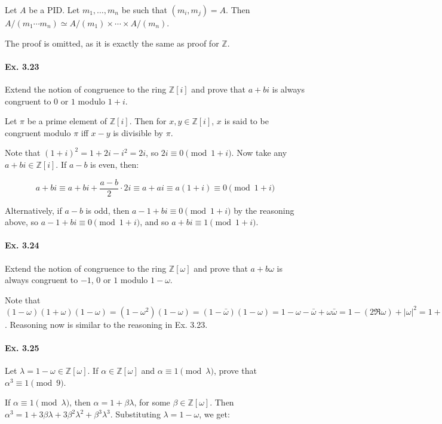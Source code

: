 \documentclass[notitlepage]{article}
\theoremstyle{definition}
\newcommand\Z{\mathbb{Z}}
\begin{document}
Let $A$ be a PID. Let $m_1, \ldots, m_n$ be such that $(m_i, m_j) =
A$. Then $A/(m_1 \cdots m_n) \simeq A/(m_1) \times \cdots \times
A/(m_n)$.

The proof is omitted, as it is exactly the same as proof for $\Z$.

\paragraph{Ex. 3.23}
Extend the notion of congruence to the ring $\Z[i]$ and prove that $a
+ bi$ is always congruent to $0$ or $1$ modulo $1 + i$.

Let $\pi$ be a prime element of $\Z[i]$. Then for $x, y \in \Z[i]$,
$x$ is said to be congruent modulo $\pi$ iff $x-y$ is divisible by
$\pi$.

Note that $(1+i)^2 = 1 + 2i - i^2 = 2i$, so $2i \equiv 0 \pmod
{1+i}$. Now take any $a + bi \in \Z[i]$. If $a-b$ is even, then:

\begin{equation}
  a+bi \equiv a+bi + \frac{a-b}{2} \cdot 2i \equiv a+ai \equiv a(1+i)
  \equiv 0 \pmod {1+i}
\end{equation}

Alternatively, if $a-b$ is odd, then $a-1+bi \equiv 0 \pmod {1+i}$ by
the reasoning above, so $a-1+bi \equiv 0 \pmod {1+i}$, and so $a + bi
\equiv 1 \pmod {1+i}$.

\paragraph{Ex. 3.24}
Extend the notion of congruence to the ring $\Z[\omega]$ and prove
that $a + b\omega$ is always congruent to $-1$, $0$ or $1$ modulo $1 -
\omega$.

Note that $(1-\omega)(1+\omega)(1-\omega) = (1 - \omega^2)(1-\omega) =
(1 - \bar{\omega})(1-\omega) = 1 - \omega - \bar{\omega} +
\omega\bar{\omega} = 1 - (2 \Re \omega) + |\omega|^2 = 1 + 1 + 1
=3$. Reasoning now is similar to the reasoning in Ex. 3.23.

\paragraph{Ex. 3.25}
Let $\lambda = 1 -\omega \in \Z[\omega]$. If $\alpha \in \Z[\omega]$
and $\alpha \equiv 1 \pmod \lambda$, prove that $\alpha^3 \equiv 1
\pmod 9$.

If $\alpha \equiv 1 \pmod \lambda$, then $\alpha = 1 + \beta \lambda$,
for some $\beta \in \Z[\omega]$. Then $\alpha^3 = 1 + 3 \beta \lambda
+ 3 \beta^2 \lambda^2 + \beta^3 \lambda^3$. Substituting $\lambda = 1
- \omega$, we get:
\end{document}
